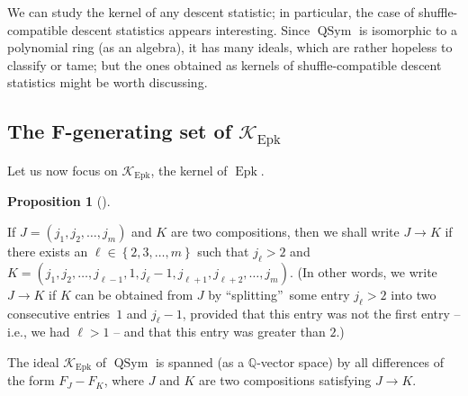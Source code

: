 \documentclass[numbers=enddot,12pt,final,onecolumn,notitlepage]{scrartcl}%
\theoremstyle{definition}
\newtheorem{prop}[theo]{Proposition}
\newenvironment{proposition}[1][]
{\begin{prop}[#1]\begin{leftbar}}
{\end{leftbar}\end{prop}}
\begin{document}
We can study the kernel of any descent statistic; in particular, the case of
shuffle-compatible descent statistics appears interesting. Since
$\operatorname*{QSym}$ is isomorphic to a polynomial ring (as an algebra), it
has many ideals, which are rather hopeless to classify or tame; but the ones
obtained as kernels of shuffle-compatible descent statistics might be worth discussing.

\subsection{The F-generating set of $\mathcal{K}_{\operatorname*{Epk}}$}

Let us now focus on $\mathcal{K}_{\operatorname*{Epk}}$, the kernel of
$\operatorname*{Epk}$.

\begin{proposition}
\label{prop.K.Epk.F}If $J=\left(  j_{1},j_{2},\ldots,j_{m}\right)  $ and $K$
are two compositions, then we shall write $J\rightarrow K$ if there exists an
$\ell\in\left\{  2,3,\ldots,m\right\}  $ such that $j_{\ell}>2$ and $K=\left(
j_{1},j_{2},\ldots,j_{\ell-1},1,j_{\ell}-1,j_{\ell+1},j_{\ell+2},\ldots
,j_{m}\right)  $. (In other words, we write $J\rightarrow K$ if $K$ can be
obtained from $J$ by \textquotedblleft splitting\textquotedblright\ some entry
$j_{\ell}>2$ into two consecutive entries\footnotemark\ $1$ and $j_{\ell}-1$,
provided that this entry was not the first entry -- i.e., we had $\ell>1$ --
and that this entry was greater than $2$.)

The ideal $\mathcal{K}_{\operatorname*{Epk}}$ of $\operatorname*{QSym}$ is
spanned (as a $\mathbb{Q}$-vector space) by all differences of the form
$F_{J}-F_{K}$, where $J$ and $K$ are two compositions satisfying $J\rightarrow
K$.
\end{proposition}

\end{document}

